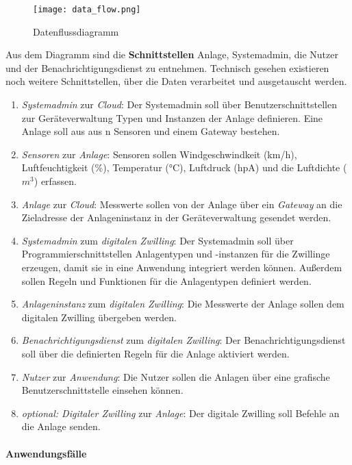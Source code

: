 \begin{figure}[ht!]
  \centering
  \texttt{[image: data\_flow.png]}
  \caption[Datenflussdiagramm]{Datenflussdiagramm}
  \label{dataflow}
\end{figure}

\noindent Aus dem Diagramm sind die \textbf{Schnittstellen} Anlage, Systemadmin, die Nutzer und der Benachrichtigungsdienst zu entnehmen. Technisch gesehen existieren noch weitere Schnittstellen, über die Daten verarbeitet und ausgetauscht werden.

\begin{enumerate}
  \item \textit{Systemadmin} zur \textit{Cloud}: Der Systemadmin soll über Benutzerschnittstellen zur Geräteverwaltung Typen und Instanzen der Anlage definieren. Eine Anlage soll aus aus n Sensoren und einem Gateway bestehen.
  \item \textit{Sensoren} zur \textit{Anlage}: Sensoren sollen Windgeschwindkeit (km/h), Luftfeuchtigkeit (\%), Temperatur (°C), Luftdruck (hpA) und die Luftdichte ($m^3$) erfassen.
  \item \textit{Anlage} zur \textit{Cloud}: Messwerte sollen von der Anlage über ein \textit{Gateway} an die Zieladresse der Anlageninstanz in der Geräteverwaltung gesendet werden.
  \item \textit{Systemadmin} zum \textit{digitalen Zwilling}: Der Systemadmin soll über Programmierschnittstellen Anlagentypen und -instanzen für die Zwillinge erzeugen, damit sie in eine Anwendung integriert werden können. Außerdem sollen Regeln und Funktionen für die Anlagentypen definiert werden.
  \item \textit{Anlageninstanz} zum \textit{digitalen Zwilling}: Die Messwerte der Anlage sollen dem digitalen Zwilling übergeben werden.
  \item \textit{Benachrichtigungsdienst} zum \textit{digitalen Zwilling}: Der Benachrichtigungsdienst soll über die definierten Regeln für die Anlage aktiviert werden.
  \item \textit{Nutzer} zur \textit{Anwendung}: Die Nutzer sollen die Anlagen über eine grafische Benutzerschnittstelle einsehen können.
  \item \textit{optional: Digitaler Zwilling} zur \textit{Anlage}: Der digitale Zwilling soll Befehle an die Anlage senden.
\end{enumerate}

\paragraph{Anwendungsfälle}

